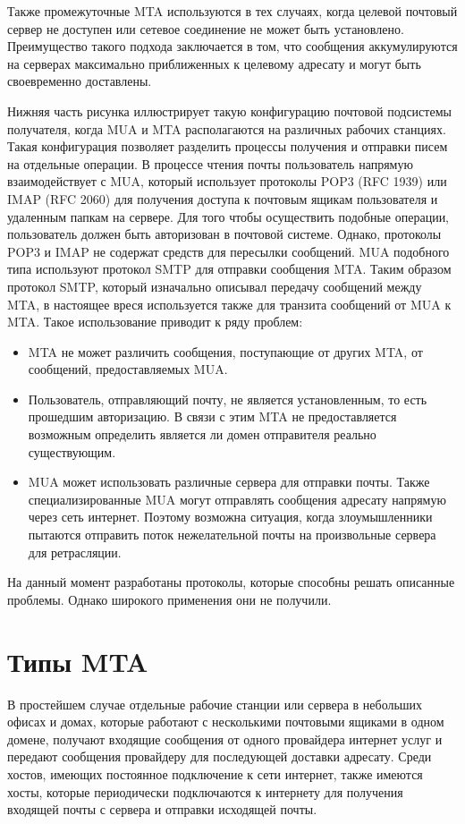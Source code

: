 Также промежуточные MTA используются в тех случаях, когда целевой почтовый сервер не доступен или сетевое соединение не может быть установлено. Преимущество такого подхода заключается в том, что сообщения аккумулируются на серверах максимально приближенных к целевому адресату и могут быть своевременно доставлены.

Нижняя часть рисунка иллюстрирует такую конфигурацию почтовой подсистемы получателя, когда MUA и MTA располагаются на различных рабочих станциях. Такая конфигурация позволяет разделить процессы получения и отправки писем на отдельные операции. В процессе чтения почты пользователь напрямую взаимодействует с MUA, который использует протоколы POP3 (RFC 1939) или IMAP (RFC 2060) для получения доступа к почтовым ящикам пользователя и удаленным папкам на сервере. Для того чтобы осуществить подобные операции, пользователь должен быть авторизован в почтовой системе. Однако, протоколы POP3 и IMAP не содержат средств для пересылки сообщений. MUA подобного типа используют протокол SMTP для отправки сообщения MTA. Таким образом протокол SMTP, который изначально описывал передачу сообщений между MTA, в настоящее вреся используется также для транзита сообщений от MUA к MTA. Такое использование приводит к ряду проблем:

\begin{itemize}
\item MTA не может различить сообщения, поступающие от других MTA, от сообщений, предоставляемых MUA. 
\item Пользователь, отправляющий почту, не является установленным, то есть прошедшим авторизацию. В связи с этим MTA не предоставляется возможным определить является ли домен отправителя реально существующим.
\item MUA может использовать различные сервера для отправки почты. Также специализированные MUA могут отправлять сообщения адресату напрямую через сеть интернет. Поэтому возможна ситуация, когда злоумышленники пытаются отправить поток нежелательной почты на произвольные сервера для ретрасляции.
\end{itemize}

На данный момент разработаны протоколы, которые способны решать описанные проблемы. Однако широкого применения они не получили.


\section{Типы MTA}
В простейшем случае отдельные рабочие станции или сервера в небольших офисах и домах, которые работают с несколькими почтовыми ящиками в одном домене, получают входящие сообщения от одного провайдера интернет услуг и передают сообщения провайдеру для последующей доставки адресату. Среди хостов, имеющих постоянное подключение к сети интернет, также имеются хосты, которые периодически подключаются к интернету для получения входящей почты  с сервера и отправки исходящей почты. 

